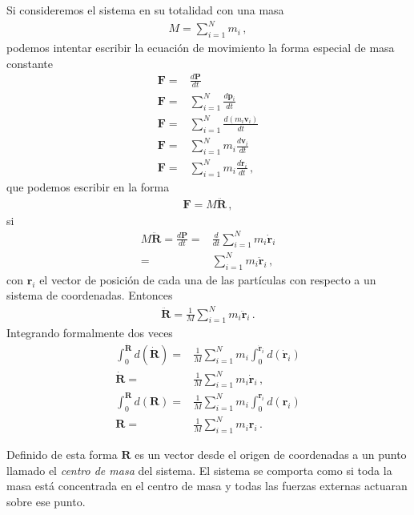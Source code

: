 Si consideremos el sistema en su totalidad con una masa
\begin{align}
  M=\sum_{i=1}^N m_i\,,
\end{align}
podemos intentar escribir la ecuación de movimiento la forma especial de masa constante
\begin{align}
    \mathbf{F}=&\frac{d\mathbf{P}}{dt}\nonumber\\
    \mathbf{F}=&\sum_{i=1}^N\frac{d\mathbf{p}_i}{dt}\nonumber\\
    \mathbf{F}=&\sum_{i=1}^N\frac{d(m_i\mathbf{v}_i)}{dt}\nonumber\\
    \mathbf{F}=&\sum_{i=1}^Nm_i\frac{d\mathbf{v}_i}{dt}\nonumber\\
    \mathbf{F}=&\sum_{i=1}^Nm_i\frac{d\dot{\mathbf{r}}_i}{dt}\,,
\end{align}
que podemos escribir en la forma
\begin{align}
  \label{eq:mcm}
  \mathbf{F}=M\ddot{\mathbf{R}}\,,
\end{align}
si
\begin{align}
  M\ddot{\mathbf{R}}=\frac{d\mathbf{P}}{dt}=&\frac{d}{dt}\sum_{i=1}^N m_i\dot{\mathbf{r}}_i\nonumber\\
=&\sum_{i=1}^N m_i\ddot{\mathbf{r}}_i\,,
\end{align}
con $\mathbf{r}_i$ el vector de posición de cada una de las partículas con respecto a un sistema de coordenadas. Entonces
\begin{align}
\label{eq:mveccm}
  \ddot{\mathbf{R}}=\frac{1}{M}\sum_{i=1}^Nm_i\ddot{\mathbf{r}}_i\,.
\end{align}
Integrando formalmente dos veces
\begin{align}
  \int_0^{\dot{\mathbf{R}}}d(\dot{\mathbf{R}})=&\frac{1}{M}
  \sum_{i=1}^N m_i\int_0^{\dot{\mathbf{r}}_i}d(\dot{\mathbf{r}}_i)\nonumber\\
  \dot{\mathbf{R}}=&\frac{1}{M}
  \sum_{i=1}^N m_i\dot{\mathbf{r}}_i\,,\nonumber\\
  \int_0^{{\mathbf{R}}}d({\mathbf{R}})=&\frac{1}{M}
  \sum_{i=1}^N m_i\int_0^{{\mathbf{r}}_i}d({\mathbf{r}}_i)\nonumber\\
  {\mathbf{R}}=&\frac{1}{M}
  \sum_{i=1}^N m_i{\mathbf{r}}_i\,.
\end{align}

Definido de esta forma $\mathbf{R}$ es un vector desde el origen de coordenadas a un punto llamado el \emph{centro de masa} del sistema. El sistema se comporta como si toda la masa está concentrada en el centro de masa y todas las fuerzas externas actuaran sobre ese punto.

